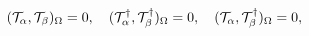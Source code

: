 \begin{equation}\label{5.20}
({\cal T}_\alpha,{\cal T}_\beta)_\Omega=0,\quad
({\cal T}^\dagger_\alpha,{\cal T}^\dagger_\beta)_\Omega=0,\quad
({\cal T}_\alpha,{\cal T}^\dagger_\beta)_\Omega=0,
\end{equation}

